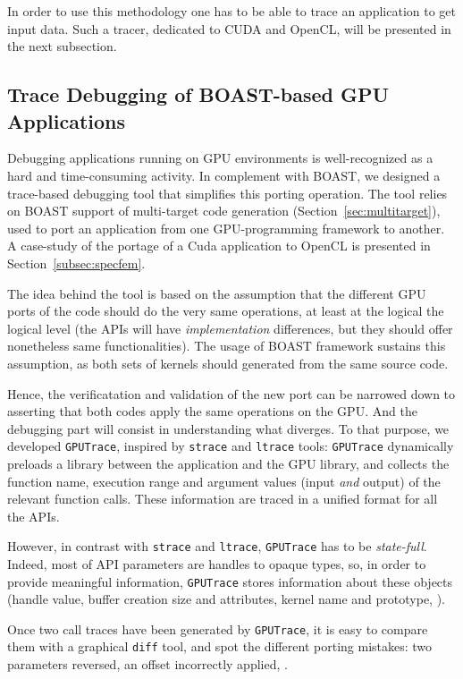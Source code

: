 \documentclass[11pt, a4paper, twoside]{montblanc}
\newcommand{\code}[1]{\texttt{#1}}
\begin{document}
In order to use this methodology one has to be able to trace an application to
get input data. Such a tracer, dedicated to CUDA and OpenCL, will be presented
in the next subsection.

\subsection{Trace Debugging of BOAST-based GPU Applications}
\label{sec:gputrace}

Debugging applications running on GPU environments is well-recognized
as a hard and time-consuming activity. In complement with BOAST, we
designed a trace-based debugging tool that simplifies this porting
operation. The tool relies on BOAST support of multi-target code
generation (Section~\ref{sec:multitarget}), used to port an
application from one GPU-programming framework to another. A
case-study of the portage of a Cuda application to OpenCL is presented
in Section~\ref{subsec:specfem}.

The idea behind the tool is based on the assumption that the different
GPU ports of the code should do the very same operations, at least at
the logical the logical level (the APIs will have
\emph{implementation} differences, but they should offer nonetheless
same functionalities). The usage of BOAST framework sustains this
assumption, as both sets of kernels should generated from the same
source code.

Hence, the verificatation and validation of the new port can be
narrowed down to asserting that both codes apply the same operations
on the GPU. And the debugging part will consist in understanding what
diverges. To that purpose, we developed \code{GPUTrace}, inspired by
\code{strace} and \code{ltrace} tools: \code{GPUTrace} dynamically
preloads a library between the application and the GPU library, and
collects the function name, execution range and argument values (input
\emph{and} output) of the relevant function calls. These information
are traced in a unified format for all the APIs.

However, in contrast with \code{strace} and \code{ltrace},
\code{GPUTrace} has to be \emph{state-full}. Indeed, most of API
parameters are handles to opaque types, so, in order to provide
meaningful information, \code{GPUTrace} stores information about these
objects (handle value, buffer creation size and attributes, kernel
name and prototype, \etc{}).

Once two call traces have been generated by \code{GPUTrace}, it is
easy to compare them with a graphical \code{diff} tool, and spot the
different porting mistakes: two parameters reversed, an offset
incorrectly applied, \etc{}.
\end{document}
